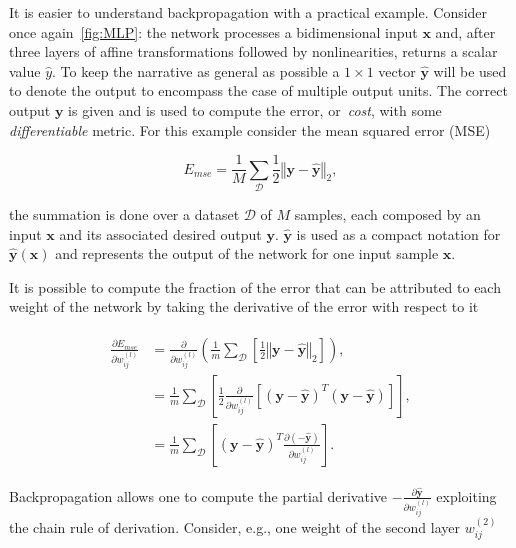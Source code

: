 It is easier to understand backpropagation with a practical example. Consider
once again~\autoref{fig:MLP}: the network processes a bidimensional input
$\mathbf{x}$ and, after three layers of affine transformations followed by
nonlinearities, returns a scalar value $\hat y$. To keep the narrative as
general as possible a $1 \times 1$ vector $\mathbf{\hat y}$ will be used to
denote the output to encompass the case of multiple output units. The correct
output $\mathbf{y}$ is given and is used to compute the error, or~\emph{cost},
with some \emph{differentiable} metric. For this example consider the mean
squared error (MSE)

\begin{equation}\label{eq:MSE}
    E_{mse} = \frac{1}{M} \sum_{\mathcal{D}}
        \frac{1}{2}\left\Vert\mathbf{y} - \mathbf{\hat y}\right\Vert_2,
\end{equation}

\noindent the summation is done over a dataset $\mathcal{D}$ of $M$ samples,
each composed by an input $\mathbf{x}$ and its associated desired output
$\mathbf{y}$. $\mathbf{\hat y}$ is used as a compact notation for
$\mathbf{\hat y(x)}$ and represents the output of the network for one input sample
$\mathbf{x}$.

It is possible to compute the fraction of the error that can be attributed to
each weight of the network by taking the derivative of the error with respect
to it

\begin{align}\label{eq:backprop_step1}
\begin{split}
    \frac{\partial E_{mse}}{\partial w_{ij}^{(l)}} &=
        \frac{\partial}{\partial w_{ij}^{(l)}}
        \left(\frac{1}{m}\sum_{\mathcal{D}}
        \left[\frac{1}{2}\left\Vert\mathbf{y} - \mathbf{\hat y}\right\Vert_2
        \right]\right) ,\\
    &= \frac{1}{m}\sum_{\mathcal{D}} \left[\frac{1}{2}
        \frac{\partial}{\partial w_{ij}^{(l)}}\left[
         \left(\mathbf{y} - \mathbf{\hat y}\right)^T
         \left(\mathbf{y} - \mathbf{\hat y}\right)\right]\right] ,\\
    &= \frac{1}{m}\sum_{\mathcal{D}}\left[(\mathbf{y} - \mathbf{\hat y})^T
        \frac{\partial(-\mathbf{\hat y})}{\partial w_{ij}^{(l)}}
        \right].
\end{split}
\end{align}

Backpropagation allows one to compute the partial derivative
$-\frac{\partial\mathbf{\hat y}}{\partial w_{ij}^{(l)}}$
exploiting the chain rule of derivation. Consider, e.g., one weight of the
second layer $w_{ij}^{(2)}$


